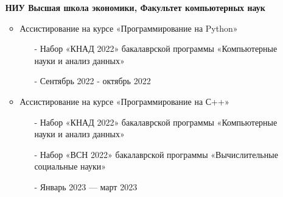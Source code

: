 \documentclass[10pt,a4paper]{altacv}
\begin{document}
\begin{itemize}
\item[] \textbf{НИУ Высшая школа экономики, Факультет компьютерных наук}
\begin{itemize}
    \item Ассистирование на курсе «Программирование на Python»
    \begin{itemize}
        \item[-] Набор «КНАД 2022» бакалаврской программы «Компьютерные науки и анализ данных»
        \item[-] Сентябрь 2022 - октябрь 2022
    \end{itemize}
    \item Ассистирование на курсе «Программирование на С++»
    \begin{itemize}
        \item[-] Набор «КНАД 2022» бакалаврской программы «Компьютерные науки и анализ данных»
        \item[-] Набор «ВСН 2022» бакалаврской программы «Вычислительные социальные науки»
        \item[-] Январь 2023 --- март 2023
    \end{itemize}
\end{itemize}
\end{itemize}


\clearpage
\end{document}
